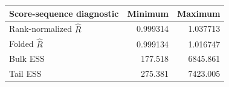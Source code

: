\begin{tabular}{@{}lrr@{}}
\toprule
Score-sequence diagnostic & Minimum & Maximum \\
\midrule
Rank-normalized \(\widehat R\) & 0.999314 & 1.037713 \\
Folded \(\widehat R\) & 0.999134 & 1.016747 \\
Bulk ESS & 177.518 & 6845.861 \\
Tail ESS & 275.381 & 7423.005 \\
\bottomrule
\end{tabular}
